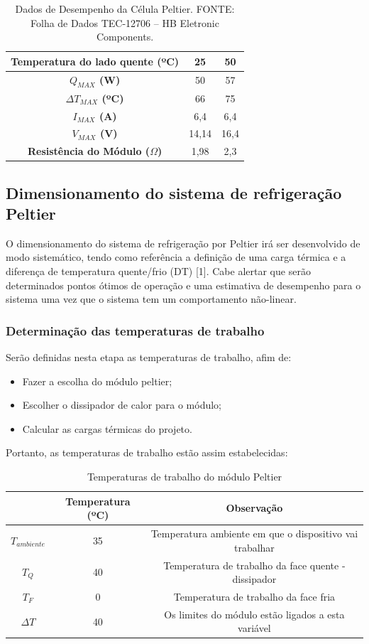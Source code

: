 \begin{table}[H]
\begin{center}
\caption{Dados de Desempenho da Célula Peltier. FONTE: Folha de Dados TEC-12706 – HB Eletronic Components.}
\begin{tabular}{|c|c|c|}
\hline
\textbf{Temperatura do lado quente (ºC)} & 25 & 50  \\
\hline
\textbf{$Q_{MAX}$ (W)} & 50 & 57 \\
\hline
\textbf{$\Delta T_{MAX}$ (ºC)}& 66 & 75 \\
\hline
\textbf{$I_{MAX}$ (A)} & 6,4 & 6,4 \\
\hline
\textbf{$V_{MAX}$ (V)} & 14,14 & 16,4 \\
\hline 
\textbf{Resistência do Módulo ($\Omega$)} & 1,98 & 2,3\\
\hline
\end{tabular}

\end{center}
\end{table}
\subsection{Dimensionamento do sistema de refrigeração Peltier}
O dimensionamento do sistema de refrigeração por Peltier irá ser desenvolvido de modo sistemático, tendo como referência a definição de uma carga térmica e a diferença de temperatura quente/frio (DT) [1]. Cabe alertar que serão determinados pontos ótimos de operação e uma estimativa de desempenho para o sistema uma vez que o sistema tem um comportamento não-linear. 

\subsubsection{Determinação das temperaturas de trabalho}
Serão definidas nesta etapa as temperaturas de trabalho, afim de:
\begin{itemize}
	\item Fazer a escolha do módulo peltier;
    \item Escolher o dissipador de calor para o módulo;
    \item Calcular as cargas térmicas do projeto. 
\end{itemize}
Portanto, as temperaturas de trabalho estão assim estabelecidas:
\begin{table}[H]
\caption{ Temperaturas de trabalho do módulo Peltier}
\begin{tabular}{c|c|c}
     &  \textbf{Temperatura (ºC)} & \textbf{Observação}\\
   \hline
   $T_{ambiente}$ & 35 & Temperatura ambiente em que o dispositivo vai trabalhar \\
   $T_Q$ & 40  & 
Temperatura de trabalho da face quente - dissipador \\
$T_F$ & 0 & Temperatura de trabalho da face fria \\
$\Delta T$ & 40 & 
Os limites do módulo estão ligados a esta variável\\
\hline
\end{tabular}
\end{table}

